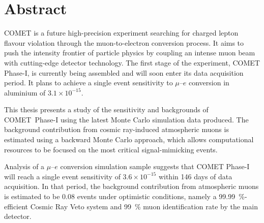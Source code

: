 \chapter*{Abstract}


COMET is a future high-precision experiment searching for charged lepton flavour
violation through the muon-to-electron conversion process. It aims to push the
intensity frontier of particle physics by coupling an intense muon beam with
cutting-edge detector technology. The first stage of the experiment, COMET
Phase\nobreakdash-I, is currently being assembled and will soon enter its data acquisition
period. It plans to achieve a single event sensitivity to $\mu$--$e$ conversion
in aluminium of $3.1 \times 10^{-15}$.

This thesis presents a study of the sensitivity and backgrounds of \mbox{COMET
Phase\nobreakdash-I} using the latest Monte Carlo simulation data produced. The background
contribution from cosmic ray-induced atmospheric muons is estimated using a
backward Monte Carlo approach, which allows computational resources to be
focused on the most critical signal-mimicking events.

Analysis of a $\mu$--$e$ conversion simulation sample suggests that COMET
Phase\nobreakdash-I will reach a single event sensitivity of $3.6 \times 10^{-15}$ within 146
days of data acquisition. 
In that period, the background contribution from atmospheric muons is estimated
to be 0.08 events under optimistic conditions, namely a
\SI{99.99}{\percent}-efficient Cosmic Ray Veto system and \SI{99}{\percent} muon
identification rate by the main detector.